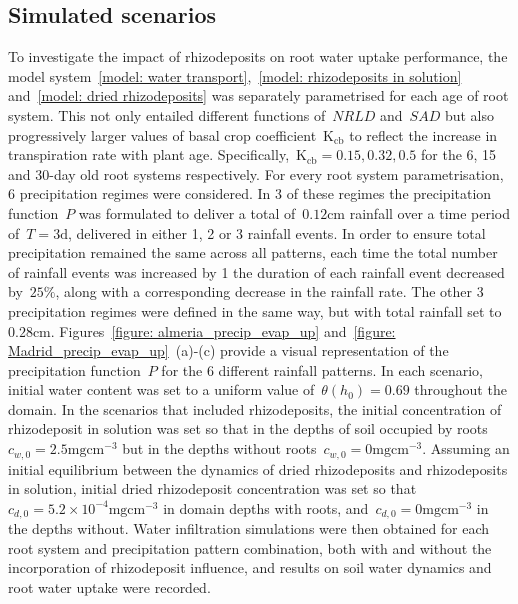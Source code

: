 \documentclass[11pt,a4paper]{article}
\numberwithin{equation}{section}
\begin{document}
\subsection{Simulated scenarios}
To investigate the impact of rhizodeposits on root water uptake performance, the model system~\eqref{model: water transport},~\eqref{model: rhizodeposits in solution} and~\eqref{model: dried rhizodeposits} was separately parametrised for each age of root system. This not only entailed different functions of~$NRLD$ and~$SAD$ but also progressively larger values of basal crop coefficient~$\text{K}_{\text{cb}}$ to reflect the increase in transpiration rate with plant age. Specifically,~$\text{K}_{\text{cb}} = 0.15, 0.32, 0.5$ for the 6, 15 and 30-day old root systems respectively. For every root system parametrisation, 6 precipitation regimes were considered. In 3 of these regimes the precipitation function~$P$ was formulated to deliver a total of~$0.12\text{cm}$ rainfall over a time period of~$T=3\text{d}$, delivered in either 1, 2 or 3 rainfall events. In order to ensure total precipitation remained the same across all patterns, each time the total number of rainfall events was increased by 1 the duration of each rainfall event decreased by~$25\%$, along with a corresponding decrease in the rainfall rate. The other 3 precipitation regimes were defined in the same way, but with total rainfall set to~$0.28\text{cm}$. Figures~\ref{figure: almeria_precip_evap_up} and~\ref{figure: Madrid_precip_evap_up}~(a)-(c) provide a visual representation of the precipitation function~$P$ for the 6 different rainfall patterns. In each scenario, initial water content was set to a uniform value of~$\theta(h_0) = 0.69$ throughout the domain. In the scenarios that included rhizodeposits, the initial concentration of rhizodeposit in solution was set so that in the depths of soil occupied by roots~$c_{w,0}=2.5\text{mgcm}^{-3}$ but in the depths without roots~$c_{w,0}=0\text{mgcm}^{-3}$. Assuming an initial equilibrium between the dynamics of dried rhizodeposits and rhizodeposits in solution, initial dried rhizodeposit concentration was set so that~$c_{d, 0}=5.2\times10^{-4}\text{mgcm}^{-3}$ in domain depths with roots, and~$c_{d, 0}=0\text{mgcm}^{-3}$ in the depths without. Water infiltration simulations were then obtained for each root system and precipitation pattern combination, both with and without the incorporation of rhizodeposit influence, and results on soil water dynamics and root water uptake were recorded.    
\end{document}
